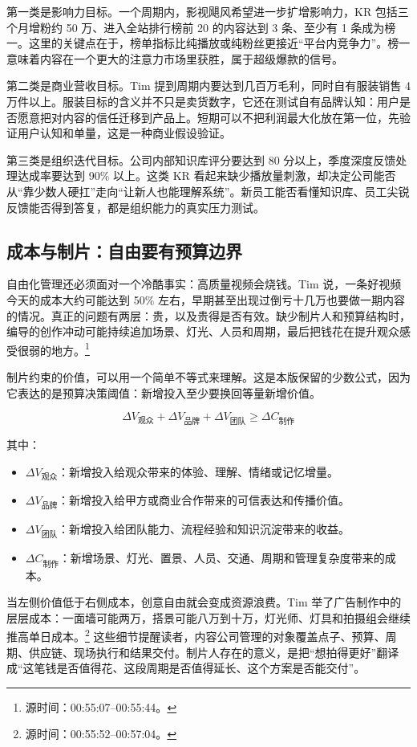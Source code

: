 \documentclass[a4paper]{article}
\begin{document}
第一类是影响力目标。一个周期内，影视飓风希望进一步扩增影响力，KR 包括三个月增粉约 50 万、进入全站排行榜前 20 的内容达到 3 条、至少有 1 条成为榜一。这里的关键点在于，榜单指标比纯播放或纯粉丝更接近“平台内竞争力”。榜一意味着内容在一个更大的注意力市场里获胜，属于超级爆款的信号。

第二类是商业营收目标。Tim 提到周期内要达到几百万毛利，同时自有服装销售 4 万件以上。服装目标的含义并不只是卖货数字，它还在测试自有品牌认知：用户是否愿意把对内容的信任迁移到产品上。短期可以不把利润最大化放在第一位，先验证用户认知和单量，这是一种商业假设验证。

第三类是组织迭代目标。公司内部知识库评分要达到 80 分以上，季度深度反馈处理达成率要达到 90\% 以上。这类 KR 看起来缺少播放量刺激，却决定公司能否从“靠少数人硬扛”走向“让新人也能理解系统”。新员工能否看懂知识库、员工尖锐反馈能否得到答复，都是组织能力的真实压力测试。

\subsection{成本与制片：自由要有预算边界}

自由化管理还必须面对一个冷酷事实：高质量视频会烧钱。Tim 说，一条好视频今天的成本大约可能达到 50\% 左右，早期甚至出现过倒亏十几万也要做一期内容的情况。真正的问题有两层：贵，以及贵得是否有效。缺少制片人和预算结构时，编导的创作冲动可能持续追加场景、灯光、人员和周期，最后把钱花在提升观众感受很弱的地方。\footnote{源时间：00:55:07--00:55:44。}

制片约束的价值，可以用一个简单不等式来理解。这是本版保留的少数公式，因为它表达的是预算决策阈值：新增投入至少要换回等量新增价值。

$$
\Delta V_{\text{观众}} + \Delta V_{\text{品牌}} + \Delta V_{\text{团队}} \geq \Delta C_{\text{制作}}
$$

其中：
\begin{itemize}
  \item $\Delta V_{\text{观众}}$：新增投入给观众带来的体验、理解、情绪或记忆增量。
  \item $\Delta V_{\text{品牌}}$：新增投入给甲方或商业合作带来的可信表达和传播价值。
  \item $\Delta V_{\text{团队}}$：新增投入给团队能力、流程经验和知识沉淀带来的收益。
  \item $\Delta C_{\text{制作}}$：新增场景、灯光、置景、人员、交通、周期和管理复杂度带来的成本。
\end{itemize}

当左侧价值低于右侧成本，创意自由就会变成资源浪费。Tim 举了广告制作中的层层成本：一面墙可能两万，搭景可能八万到十万，灯光师、灯具和拍摄组会继续推高单日成本。\footnote{源时间：00:55:52--00:57:04。} 这些细节提醒读者，内容公司管理的对象覆盖点子、预算、周期、供应链、现场执行和结果交付。制片人存在的意义，是把“想拍得更好”翻译成“这笔钱是否值得花、这段周期是否值得延长、这个方案是否能交付”。
\end{document}
